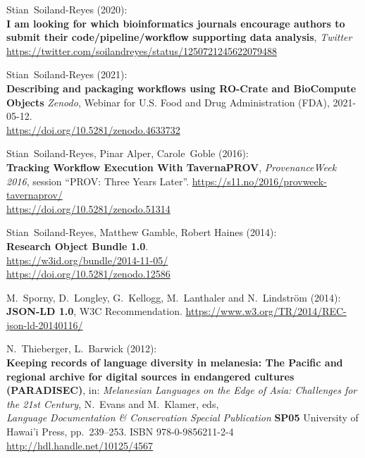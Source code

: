 \begin{thebibliography}{9}
Stian~Soiland-Reyes (2020):\\
\textbf{I am looking for which bioinformatics journals encourage authors
to submit their code/pipeline/workflow supporting data analysis},
\emph{Twitter}
\url{https://twitter.com/soilandreyes/status/1250721245622079488}

Stian~Soiland-Reyes (2021):\\
\textbf{Describing and packaging workflows using RO-Crate and BioCompute
Objects} \emph{Zenodo}, Webinar for U.S. Food and Drug Administration
(FDA), 2021-05-12.\\
\url{https://doi.org/10.5281/zenodo.4633732}

Stian~Soiland-Reyes, Pinar Alper, Carole~Goble (2016):\\
\textbf{Tracking Workflow Execution With TavernaPROV},
\emph{ProvenanceWeek 2016}, session ``PROV: Three Years Later''.
\url{https://s11.no/2016/provweek-tavernaprov/}\\
\url{https://doi.org/10.5281/zenodo.51314}

Stian~Soiland-Reyes, Matthew Gamble, Robert Haines (2014):\\
\textbf{Research Object Bundle 1.0}.\\
\url{https://w3id.org/bundle/2014-11-05/}\\
\url{https://doi.org/10.5281/zenodo.12586}

M.~Sporny, D.~Longley, G.~Kellogg, M.~Lanthaler and
N.~Lindström (2014):\\
\textbf{JSON-LD 1.0}, W3C Recommendation.
\url{https://www.w3.org/TR/2014/REC-json-ld-20140116/}


N.~Thieberger, L.~Barwick (2012):\\
\textbf{Keeping records of language diversity in melanesia: The Pacific
and regional archive for digital sources in endangered cultures
(PARADISEC)}, in: \emph{Melanesian Languages on the Edge of Asia:
Challenges for the 21st Century}, N.~Evans and M.~Klamer, eds,\\
\emph{Language Documentation \& Conservation Special Publication}
\textbf{SP05} University of Hawai'i Press, pp.~239--253. ISBN
978-0-9856211-2-4\\
\url{http://hdl.handle.net/10125/4567}


\end{thebibliography}
